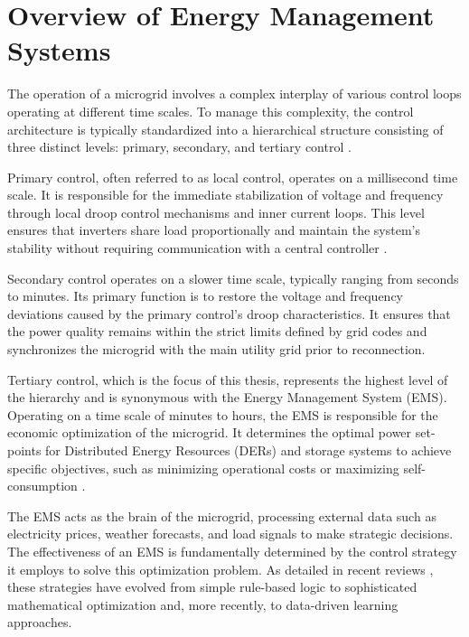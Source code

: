 
\section{Overview of Energy Management Systems}

The operation of a microgrid involves a complex interplay of various control loops operating at different time scales. To manage this complexity, the control architecture is typically standardized into a hierarchical structure consisting of three distinct levels: primary, secondary, and tertiary control \cite{Guerrero2011}.

Primary control, often referred to as local control, operates on a millisecond time scale. It is responsible for the immediate stabilization of voltage and frequency through local droop control mechanisms and inner current loops. This level ensures that inverters share load proportionally and maintain the system's stability without requiring communication with a central controller \cite{Olivares2014}.

Secondary control operates on a slower time scale, typically ranging from seconds to minutes. Its primary function is to restore the voltage and frequency deviations caused by the primary control's droop characteristics. It ensures that the power quality remains within the strict limits defined by grid codes and synchronizes the microgrid with the main utility grid prior to reconnection.

Tertiary control, which is the focus of this thesis, represents the highest level of the hierarchy and is synonymous with the Energy Management System (EMS). Operating on a time scale of minutes to hours, the EMS is responsible for the economic optimization of the microgrid. It determines the optimal power set-points for Distributed Energy Resources (DERs) and storage systems to achieve specific objectives, such as minimizing operational costs or maximizing self-consumption \cite{Zia2018}.

The EMS acts as the brain of the microgrid, processing external data such as electricity prices, weather forecasts, and load signals to make strategic decisions. The effectiveness of an EMS is fundamentally determined by the control strategy it employs to solve this optimization problem. As detailed in recent reviews \cite{turn0search2}, these strategies have evolved from simple rule-based logic to sophisticated mathematical optimization and, more recently, to data-driven learning approaches.
